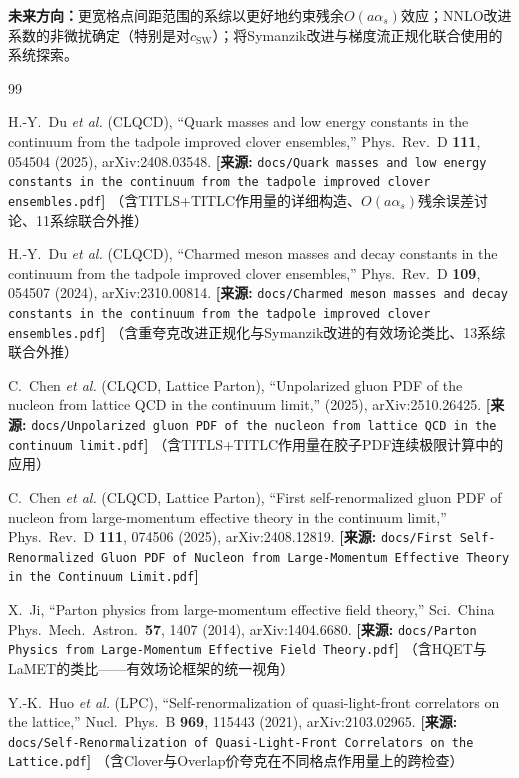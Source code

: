 \documentclass[12pt,a4paper]{ctexart}
\theoremstyle{definition}
\begin{document}
\textbf{未来方向：}更宽格点间距范围的系综以更好地约束残余$O(a\alpha_s)$效应；NNLO改进系数的非微扰确定（特别是对$c_{\text{SW}}$）；将Symanzik改进与梯度流正规化联合使用的系统探索。

\begin{thebibliography}{99}

H.-Y.~Du \textit{et al.} (CLQCD),
``Quark masses and low energy constants in the continuum from the tadpole improved clover ensembles,''
Phys.\ Rev.\ D \textbf{111}, 054504 (2025), arXiv:2408.03548.
\quad\textbf{[来源:} \texttt{docs/Quark masses and low energy constants in the continuum from the tadpole improved clover ensembles.pdf}\textbf{]}
（含TITLS+TITLC作用量的详细构造、$O(a\alpha_s)$残余误差讨论、11系综联合外推）

H.-Y.~Du \textit{et al.} (CLQCD),
``Charmed meson masses and decay constants in the continuum from the tadpole improved clover ensembles,''
Phys.\ Rev.\ D \textbf{109}, 054507 (2024), arXiv:2310.00814.
\quad\textbf{[来源:} \texttt{docs/Charmed meson masses and decay constants in the continuum from the tadpole improved clover ensembles.pdf}\textbf{]}
（含重夸克改进正规化与Symanzik改进的有效场论类比、13系综联合外推）

C.~Chen \textit{et al.} (CLQCD, Lattice Parton),
``Unpolarized gluon PDF of the nucleon from lattice QCD in the continuum limit,''
(2025), arXiv:2510.26425.
\quad\textbf{[来源:} \texttt{docs/Unpolarized gluon PDF of the nucleon from lattice QCD in the continuum limit.pdf}\textbf{]}
（含TITLS+TITLC作用量在胶子PDF连续极限计算中的应用）

C.~Chen \textit{et al.} (CLQCD, Lattice Parton),
``First self-renormalized gluon PDF of nucleon from large-momentum effective theory in the continuum limit,''
Phys.\ Rev.\ D \textbf{111}, 074506 (2025), arXiv:2408.12819.
\quad\textbf{[来源:} \texttt{docs/First Self-Renormalized Gluon PDF of Nucleon from Large-Momentum Effective Theory in the Continuum Limit.pdf}\textbf{]}

X.~Ji,
``Parton physics from large-momentum effective field theory,''
Sci.\ China Phys.\ Mech.\ Astron.\ \textbf{57}, 1407 (2014), arXiv:1404.6680.
\quad\textbf{[来源:} \texttt{docs/Parton Physics from Large-Momentum Effective Field Theory.pdf}\textbf{]}
（含HQET与LaMET的类比——有效场论框架的统一视角）

Y.-K.~Huo \textit{et al.} (LPC),
``Self-renormalization of quasi-light-front correlators on the lattice,''
Nucl.\ Phys.\ B \textbf{969}, 115443 (2021), arXiv:2103.02965.
\quad\textbf{[来源:} \texttt{docs/Self-Renormalization of Quasi-Light-Front Correlators on the Lattice.pdf}\textbf{]}
（含Clover与Overlap价夸克在不同格点作用量上的跨检查）


\end{thebibliography}
\end{document}
